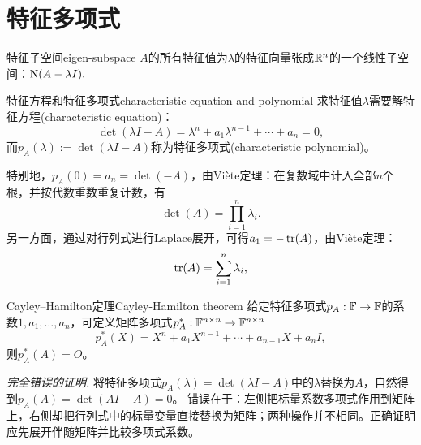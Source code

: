 \section{特征多项式}

\begin{definition}{特征子空间}{eigen-subspace}
	$A$的所有特征值为$\lambda$的特征向量张成$\mathbb{R}^n$的一个线性子空间：$\operatorname{N}(A - \lambda I).$
\end{definition}


\begin{definition}
	{特征方程和特征多项式}{characteristic equation and polynomial}
	求特征值$\lambda$需要解特征方程(characteristic equation)：
	\begin{equation}\label{eq:la-characteristic-equation}
		\det(\lambda I - A) = \lambda^n + a_1\lambda^{n-1} + \cdots + a_n = 0,
	\end{equation}
	而$p_A(\lambda) := \det(\lambda I - A)$称为特征多项式(characteristic polynomial)。
\end{definition}

\begin{corollary}
	特别地，$p_A(0) = a_n = \det(-A)$，由Viète定理：在复数域中计入全部$n$个根，并按代数重数重复计数，有
	\begin{equation}
		\label{eqn:det lambda}
		\det(A) = \prod_{i=1}^n\lambda_i.
	\end{equation}
	另一方面，通过对行列式进行Laplace展开，可得$a_1 = -\operatorname{tr}(A)$，由Viète定理：
	\begin{equation}
		\label{eqn:trace lambda}
		\operatorname{tr}(A) = \sum_{i=1}^n\lambda_i,
	\end{equation}
\end{corollary}


\begin{theorem}
	{Cayley--Hamilton定理}{Cayley-Hamilton theorem}
	给定特征多项式$p_A:\mathbb{F} \to \mathbb{F}$的系数$1,a_1,\ldots,a_n$，可定义矩阵多项式$p_A^*:\mathbb{F}^{n\times n} \to \mathbb{F}^{n\times n}$
	\begin{equation}
		p_A^*(X) = X^n + a_1X^{n-1} + \cdots + a_{n-1}X + a_nI,
	\end{equation}
	则$p_A^*(A) = O$。
\end{theorem}

\noindent
\textit{完全错误的证明.}
将特征多项式$p_A(\lambda) = \det(\lambda I - A)$中的$\lambda$替换为$A$，自然得到$p_A(A) = \det(AI - A) = 0$。
错误在于：左侧把标量系数多项式作用到矩阵上，右侧却把行列式中的标量变量直接替换为矩阵；两种操作并不相同。正确证明应先展开伴随矩阵并比较多项式系数。

